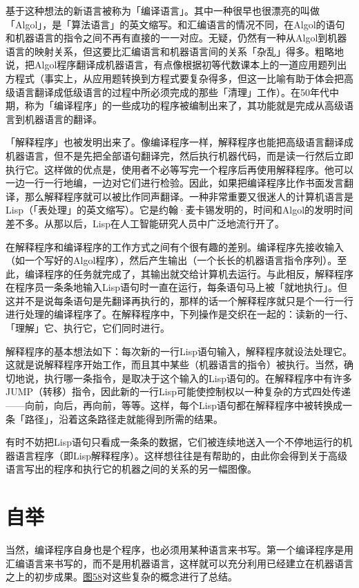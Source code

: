 \documentclass[
  12pt,
  twoside,
  openright,
  oldfontcommands,
]{memoir}
\begin{document}
基于这种想法的新语言被称为「编译语言」。其中一种很早也很漂亮的叫做「Algol」，是「算法语言」的英文缩写。和汇编语言的情况不同，在Algol的语句和机器语言的指令之间不再有直接的一一对应。无疑，仍然有一种从Algol到机器语言的映射关系，但这要比汇编语言和机器语言间的关系「杂乱」得多。粗略地说，把Algol程序翻译成机器语言，有点像根据初等代数课本上的一道应用题列出方程式（事实上，从应用题转换到方程式要复杂得多，但这一比喻有助于体会把高级语言翻译成低级语言的过程中所必须完成的那些「清理」工作）。在50年代中期，称为「编译程序」的一些成功的程序被编制出来了，其功能就是完成从高级语言到机器语言的翻译。

「解释程序」也被发明出来了。像编译程序一样，解释程序也能把高级语言翻译成机器语言，但不是先把全部语句翻译完，然后执行机器代码，而是读一行然后立即执行它。这样做的优点是，使用者不必等写完一个程序后再使用解释程序。他可以一边一行一行地编，一边对它们进行检验。因此，如果把编译程序比作书面发言翻译，那么解释程序就可以被比作同声翻译。一种非常重要又很迷人的计算机语言是Lisp（「表处理」的英文缩写）。它是约翰·麦卡锡发明的，时间和Algol的发明时间差不多。从那以后，Lisp在人工智能研究人员中广泛地流行开了。

在解释程序和编译程序的工作方式之间有个很有趣的差别。编译程序先接收输入（如一个写好的Algol程序），然后产生输出（一个长长的机器语言指令序列）。至此，编译程序的任务就完成了，其输出就交给计算机去运行。与此相反，解释程序在程序员一条条地输入Lisp语句时一直在运行，每条语句马上被「就地执行」。但这并不是说每条语句是先翻译再执行的，那样的话一个解释程序就只是个一行一行进行处理的编译程序了。在解释程序中，下列操作是交织在一起的：读新的一行、「理解」它、执行它，它们同时进行。

解释程序的基本想法如下：每次新的一行Lisp语句输入，解释程序就设法处理它。这就是说解释程序开始工作，而且其中某些（机器语言的指令）被执行。当然，确切地说，执行哪一条指令，是取决于这个输入的Lisp语句的。在解释程序中有许多JUMP（转移）指令，因此新的一行Lisp可能使控制权以一种复杂的方式四处传递------向前，向后，再向前，等等。这样，每个Lisp语句都在解释程序中被转换成一条「路径」，沿着这条路径走就能得到所需的结果。

有时不妨把Lisp语句只看成一条条的数据，它们被连续地送入一个不停地运行的机器语言程序（即Lisp解释程序）。这样想往往是有帮助的，由此你会得到关于高级语言写出的程序和执行它的机器之间的关系的另一幅图像。

\section{自举}

当然，编译程序自身也是个程序，也必须用某种语言来书写。第一个编译程序是用汇编语言来书写的，而不是用机器语言，这样就可以充分利用已经建立在机器语言之上的初步成果。\hyperref[fig:58]{图58}对这些复杂的概念进行了总结。
\end{document}
